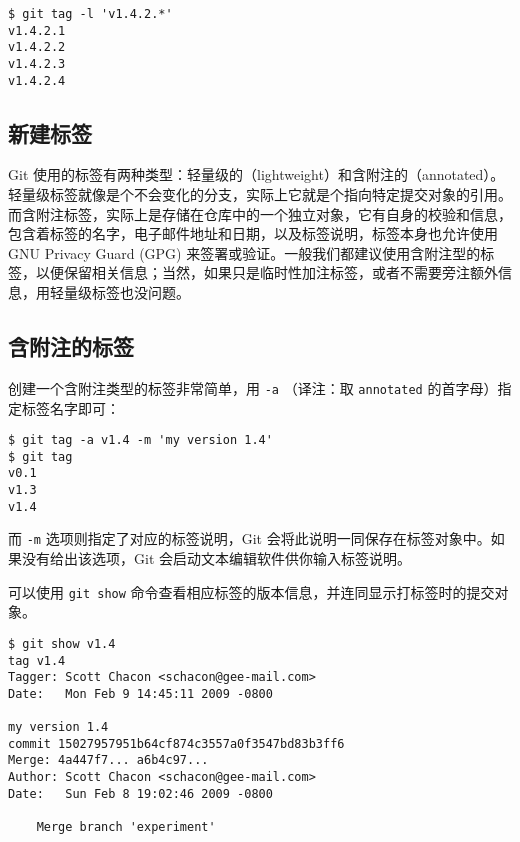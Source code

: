 \documentclass[a4paper]{book}
\begin{document}
\begin{shaded}\begin{verbatim}
$ git tag -l 'v1.4.2.*'
v1.4.2.1
v1.4.2.2
v1.4.2.3
v1.4.2.4
\end{verbatim}\end{shaded}

\subsection{新建标签}

Git 使用的标签有两种类型：轻量级的（lightweight）和含附注的（annotated）。轻量级标签就像是个不会变化的分支，实际上它就是个指向特定提交对象的引用。而含附注标签，实际上是存储在仓库中的一个独立对象，它有自身的校验和信息，包含着标签的名字，电子邮件地址和日期，以及标签说明，标签本身也允许使用 GNU Privacy Guard (GPG) 来签署或验证。一般我们都建议使用含附注型的标签，以便保留相关信息；当然，如果只是临时性加注标签，或者不需要旁注额外信息，用轻量级标签也没问题。

\subsection{含附注的标签}

创建一个含附注类型的标签非常简单，用 \texttt{-a} （译注：取 \texttt{annotated} 的首字母）指定标签名字即可：

\begin{shaded}\begin{verbatim}
$ git tag -a v1.4 -m 'my version 1.4'
$ git tag
v0.1
v1.3
v1.4
\end{verbatim}\end{shaded}

而 \texttt{-m} 选项则指定了对应的标签说明，Git 会将此说明一同保存在标签对象中。如果没有给出该选项，Git 会启动文本编辑软件供你输入标签说明。

可以使用 \texttt{git show} 命令查看相应标签的版本信息，并连同显示打标签时的提交对象。

\begin{shaded}\begin{verbatim}
$ git show v1.4
tag v1.4
Tagger: Scott Chacon <schacon@gee-mail.com>
Date:   Mon Feb 9 14:45:11 2009 -0800

my version 1.4
commit 15027957951b64cf874c3557a0f3547bd83b3ff6
Merge: 4a447f7... a6b4c97...
Author: Scott Chacon <schacon@gee-mail.com>
Date:   Sun Feb 8 19:02:46 2009 -0800

    Merge branch 'experiment'
\end{verbatim}\end{shaded}
\end{document}
